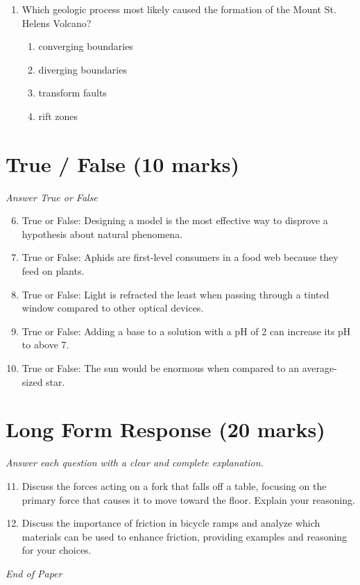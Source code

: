 \documentclass[12pt]{article}
\begin{document}
\begin{enumerate}[label=\arabic*.]
\begin{enumerate}[label=(\alph*)]
    \item planting a tree
    \item adding a freshwater source
    \item creating a nature sanctuary
\end{enumerate}
\item Which geologic process most likely caused the formation of the Mount St. Helens Volcano?
\begin{enumerate}[label=(\alph*)]
    \item converging boundaries
    \item diverging boundaries
    \item transform faults
    \item rift zones
\end{enumerate}
\end{enumerate}

\section*{True / False (10 marks)}
\textit{Answer True or False}
\begin{enumerate}[label=\arabic*.]
\setcounter{enumi}{5}
\item True or False: Designing a model is the most effective way to disprove a hypothesis about natural phenomena.
\item True or False: Aphids are first-level consumers in a food web because they feed on plants.
\item True or False: Light is refracted the least when passing through a tinted window compared to other optical devices.
\item True or False: Adding a base to a solution with a pH of 2 can increase its pH to above 7.
\item True or False: The sun would be enormous when compared to an average-sized star.
\end{enumerate}

\section*{Long Form Response (20 marks)}
\textit{Answer each question with a clear and complete explanation.}
\begin{enumerate}[label=\arabic*.]
\setcounter{enumi}{10}
\item Discuss the forces acting on a fork that falls off a table, focusing on the primary force that causes it to move toward the floor. Explain your reasoning.
\item Discuss the importance of friction in bicycle ramps and analyze which materials can be used to enhance friction, providing examples and reasoning for your choices.
\end{enumerate}

\vfill
\noindent\textit{End of Paper}
\end{document}
